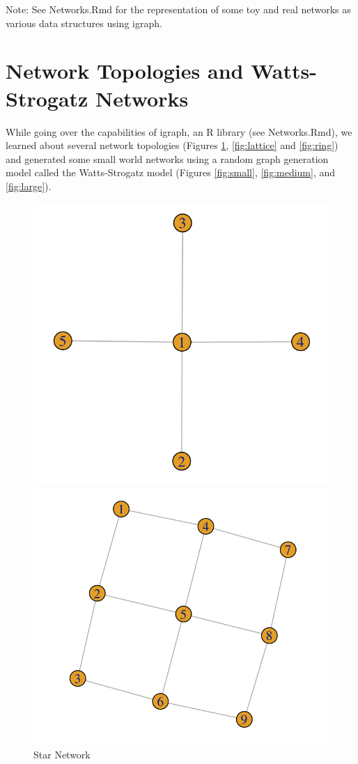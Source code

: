 Note: See Networks.Rmd for the representation of some toy and real networks as various data structures using igraph.

\section{Network Topologies and Watts-Strogatz Networks}
While going over the capabilities of igraph, an R library (see Networks.Rmd), we learned about several network topologies (Figures \ref{fig:star}, \ref{fig:lattice} and \ref{fig:ring}) and generated some small world networks using a random graph generation model called the Watts-Strogatz model (Figures \ref{fig:small}, \ref{fig:medium}, and \ref{fig:large}).

\begin{figure}
\centering
\begin{minipage}{.3\textwidth}
  \centering
  \includegraphics[width=.7\linewidth]{figures/star.png}
  \caption{Star Network}
  \label{fig:star}
\end{minipage}%
\begin{minipage}{.3\textwidth}
  \centering
  \includegraphics[width=.7\linewidth]{figures/lattice.png}

\end{minipage}
\end{figure}
